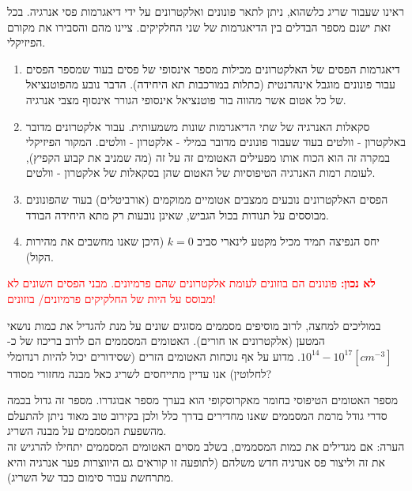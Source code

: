 \documentclass{article}
\begin{document}
\begin{Question}
\begin{SubQuestion}
    ראינו שעבור שריג כלשהוא, ניתן לתאר פונונים ואלקטרונים על ידי דיאגרמות פסי אנרגיה. בכל זאת ישנם מספר הבדלים בין הדיאגרמות של שני החלקיקים. ציינו מהם והסבירו את מקורם הפיזיקלי.
\end{SubQuestion}
\begin{SubAnswer}
\begin{enumerate}
    \item דיאגרמות הפסים של האלקטרונים מכילות מספר אינסופי של פסים בעוד שמספר הפסים עבור פונונים מוגבל אינהרנטית (כתלות במורכבות תא היחידה). הדבר נובע מהפוטנציאל של כל אטום אשר מהווה בור פוטנציאל אינסופי הגורר אינסוף מצבי אנרגיה.
    \item סקאלות האנרגיה של שתי הדיאגרמות שונות משמעותית. עבור אלקטרונים מדובר באלקטרון - וולטים בעוד שעבור פונונים מדובר במילי - אלקטרון - וולטים. המקור הפיזיקלי במקרה זה הוא הכוח אותו מפעילים האטומים זה על זה (מה שמניב את קבוע הקפיץ), לעומת רמות האנרגיה הטיפוסיות של האטום שהן בסקאלות של אלקטרון - וולטים.
    \item הפסים האלקטרונים נובעים ממצבים אטומיים ממוקמים (אורביטלים) בעוד שהפונונים מבוססים על תנודות בכול הגביש, שאינן נובעות רק מתא היחידה הבודד.
    \item יחס הנפיצה תמיד מכיל מקטע לינארי סביב $k=0$ (היכן שאנו מחשבים את מהירות הקול).
\end{enumerate}
\textcolor{red}{\textbf{לא נכון:} פונונים הם בוזונים לעומת אלקטרונים שהם פרמיונים. מבני הפסים השונים לא מבוסס על היות של החלקיקים פרמיונים/ בוזונים!}
\end{SubAnswer}
\begin{SubQuestion}
במוליכים למחצה, לרוב מוסיפים מסממים מסוגים שונים על מנת להגדיל את כמות נושאי המטען (אלקטרונים או חורים). האטומים המסממים הם לרוב בריכוז של כ- ${10^{14} - 10^{17}\left[ cm^{-3} \right]}$. מדוע על אף נוכחות האטומים הזרים (שסידורים יכול להיות רנדומלי לחלוטין) אנו עדיין מתייחסים לשריג כאל מבנה מחזורי מסודר?
\end{SubQuestion}
\begin{SubAnswer}
מספר האטומים הטיפוסי בחומר מאקרוסקופי הוא בערך מספר אבוגדרו. מספר זה גדול בכמה סדרי גודל מרמת המסממים שאנו מחדירים בדרך כלל ולכן בקירוב טוב מאוד ניתן להתעלם מהשפעת המסממים על מבנה השריג.\\
הערה: אם מגדילים את כמות המסממים, בשלב מסוים האטומים המסממים יתחילו להרגיש זה את זה וליצור פס אנרגיה חדש משלהם (לתופעה זו קוראים גם היווצרות פער אנרגיה והיא מתרחשת עבור סימום כבד של השריג).
\end{SubAnswer}
\begin{SubQuestion}

\end{SubQuestion}
\end{Question}
\end{document}
